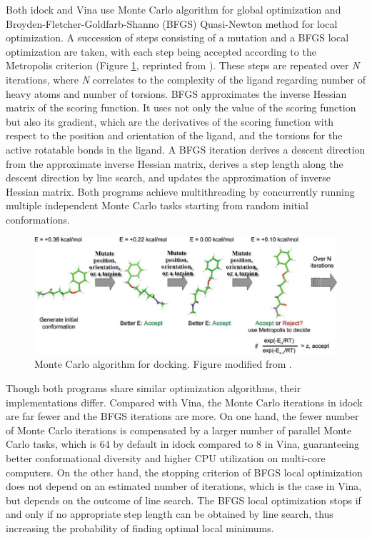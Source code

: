 \documentclass[10pt, conference, compsocconf]{IEEEtran}
\begin{document}
Both idock and Vina use Monte Carlo algorithm for global optimization and Broyden-Fletcher-Goldfarb-Shanno (BFGS) \cite{786} Quasi-Newton method for local optimization. A succession of steps consisting of a mutation and a BFGS local optimization are taken, with each step being accepted according to the Metropolis criterion (Figure \ref{fig:DockingByMonteCarlo}, reprinted from \cite{493}). These steps are repeated over \textit{N} iterations, where \textit{N} correlates to the complexity of the ligand regarding number of heavy atoms and number of torsions. BFGS approximates the inverse Hessian matrix of the scoring function. It uses not only the value of the scoring function but also its gradient, which are the derivatives of the scoring function with respect to the position and orientation of the ligand, and the torsions for the active rotatable bonds in the ligand. A BFGS iteration derives a descent direction from the approximate inverse Hessian matrix, derives a step length along the descent direction by line search, and updates the approximation of inverse Hessian matrix. Both programs achieve multithreading by concurrently running multiple independent Monte Carlo tasks starting from random initial conformations.

\begin{figure}
\centering
\includegraphics[width=\linewidth]{Figures/MonteCarlo.png}
\caption{Monte Carlo algorithm for docking. Figure modified from \cite{493}.}
\label{fig:DockingByMonteCarlo}
\end{figure}

Though both programs share similar optimization algorithms, their implementations differ. Compared with Vina, the Monte Carlo iterations in idock are far fewer and the BFGS iterations are more. On one hand, the fewer number of Monte Carlo iterations is compensated by a larger number of parallel Monte Carlo tasks, which is 64 by default in idock compared to 8 in Vina, guaranteeing better conformational diversity and higher CPU utilization on multi-core computers. On the other hand, the stopping criterion of BFGS local optimization does not depend on an estimated number of iterations, which is the case in Vina, but depends on the outcome of line search. The BFGS local optimization stops if and only if no appropriate step length can be obtained by line search, thus increasing the probability of finding optimal local minimums.
\end{document}
